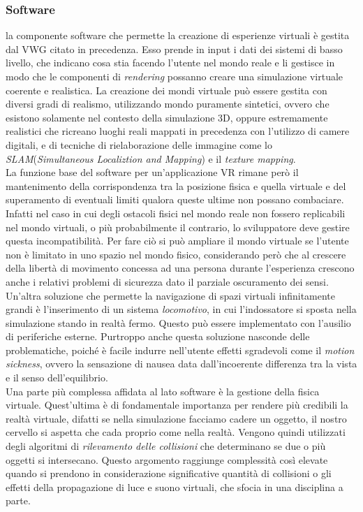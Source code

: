 \subsubsection{Software}
la componente software che permette la creazione di esperienze virtuali è gestita dal VWG citato in precedenza. Esso prende in input i dati dei sistemi di basso livello, che indicano cosa stia facendo l'utente nel mondo reale e li gestisce in modo che le componenti di \textit{rendering} possanno creare una simulazione virtuale coerente e realistica. La creazione dei mondi virtuale può essere gestita con diversi gradi di realismo, utilizzando mondo puramente sintetici, ovvero che esistono solamente nel contesto della simulazione 3D, oppure estremamente realistici che ricreano luoghi reali mappati in precedenza con l'utilizzo di camere digitali, e di tecniche di rielaborazione delle immagine come lo \textit{SLAM}(\textit{Simultaneous Localiztion and Mapping}) e il \textit{texture mapping}. \\
La funzione base del software per un'applicazione VR rimane però il mantenimento della corrispondenza tra la posizione fisica e quella virtuale e del superamento di eventuali limiti qualora queste ultime non possano combaciare. Infatti nel caso in cui degli  ostacoli fisici nel mondo reale non fossero replicabili nel mondo virtuali, o più probabilmente il contrario, lo sviluppatore deve gestire questa incompatibilità. Per fare ciò si può ampliare il mondo virtuale se l'utente non è limitato in uno spazio nel mondo fisico, considerando però che al crescere della libertà di movimento concessa ad una persona durante l'esperienza crescono anche i relativi problemi di sicurezza dato il parziale oscuramento dei sensi. Un'altra soluzione che permette la navigazione di spazi virtuali infinitamente grandi è l'inserimento di un sistema \textit{locomotivo}, in cui l'indossatore si sposta nella simulazione stando in realtà fermo. Questo può essere implementato con l'ausilio di periferiche esterne. Purtroppo anche questa soluzione nasconde delle problematiche, poiché è facile indurre nell'utente effetti sgradevoli come il \textit{motion sickness}, ovvero la sensazione di nausea data dall'incoerente differenza tra la vista e il senso dell'equilibrio.\\
Una parte più complessa affidata al lato software è la gestione della fisica virtuale. Quest'ultima è di fondamentale importanza per rendere più credibili la realtà virtuale, difatti se nella simulazione facciamo cadere un oggetto, il nostro cervello si aspetta che cada proprio come nella realtà. Vengono quindi utilizzati degli algoritmi di \textit{rilevamento delle collisioni} che determinano se due o più oggetti si intersecano. Questo argomento raggiunge complessità così elevate quando si prendono in considerazione significative quantità di collisioni o gli effetti della propagazione di luce e suono virtuali, che sfocia in una disciplina a parte.
